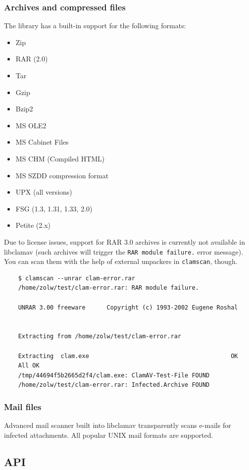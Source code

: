 \documentclass[a4paper,titlepage,12pt]{article}
\begin{document}
    \subsubsection{Archives and compressed files}
    The library has a built-in support for the following formats:
    \begin{itemize}
	\item Zip
	\item RAR (2.0)
	\item Tar
	\item Gzip
	\item Bzip2
	\item MS OLE2
	\item MS Cabinet Files
	\item MS CHM (Compiled HTML)
	\item MS SZDD compression format
	\item UPX (all versions)
	\item FSG (1.3, 1.31, 1.33, 2.0)
	\item Petite (2.x)
    \end{itemize}
    Due to license issues, support for RAR 3.0 archives is currently not
    available in libclamav (such archives will trigger the
    \verb+RAR module failure.+ error message). You can scan them with the help
    of external unpackers in \verb+clamscan+, though.
    \begin{verbatim}
	$ clamscan --unrar clam-error.rar
	/home/zolw/test/clam-error.rar: RAR module failure.

	UNRAR 3.00 freeware      Copyright (c) 1993-2002 Eugene Roshal


	Extracting from /home/zolw/test/clam-error.rar

	Extracting  clam.exe                                        OK 
	All OK
	/tmp/44694f5b2665d2f4/clam.exe: ClamAV-Test-File FOUND
	/home/zolw/test/clam-error.rar: Infected.Archive FOUND
    \end{verbatim}

    \subsubsection{Mail files}
    Advanced mail scanner built into libclamav transparently scans e-mails
    for infected attachments. All popular UNIX mail formats are supported.

    \subsection{API}
\end{document}
